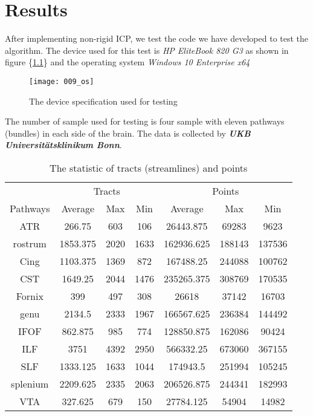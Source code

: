 \documentclass[../structure.tex]{subfiles}
\begin{document}
\chapter{Results}
\hspace{2em}After implementing non-rigid ICP, we test the code we have developed to test the algorithm. The device used for this test is \textit{HP EliteBook 820 G3} as shown in figure \{\ref{fig:OS}\} and the operating system \textit{Windows 10 Enterprise x64} 
\\
\begin{figure}[h!]
\centering
\texttt{[image: 009\_os]}
\captionsetup{justification=centering}
\caption{The device specification used for testing}
\label{fig:OS}
\end{figure}

The number of sample used for testing is four sample with eleven pathways (bundles) in each side of the brain. The data is collected by \textbf{\textit{UKB Universitätsklinikum Bonn}}. 
\begin{center}
\begin{table}[h!]
	\begin{tabular}{| c | c  c  c | c  c  c |}
	\toprule
	&\multicolumn{3}{c}{Tracts}&\multicolumn{3}{c}{Points}\\
Pathways&Average&Max&Min&Average&Max&Min\\
\midrule
ATR&266.75&603&106&26443.875&69283&9623\\
rostrum&1853.375&2020&1633&162936.625&188143&137536\\
Cing&1103.375&1369&872&167488.25&244088&100762\\
CST&1649.25&2044&1476&235265.375&308769&170535\\
Fornix&399&497&308&26618&37142&16703\\
genu&2134.5&2333&1967&166567.625&236384&144492\\
IFOF&862.875&985&774&128850.875&162086&90424\\
ILF&3751&4392&2950&566332.25&673060&367155\\
SLF&1333.125&1633&1044&174943.5&251994&105245\\
splenium&2209.625&2335&2063&206526.875&244341&182993\\
VTA&327.625&679&150&27784.125&54904&14982\\
\bottomrule
	\end{tabular}
\caption{The statistic of tracts (streamlines) and points}
\label{table:data}
\end{table}
\end{center}
\end{document}
